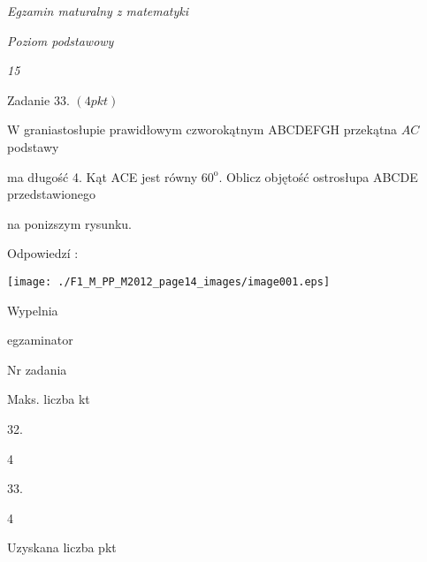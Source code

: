\documentclass[a4paper,12pt]{article}
\begin{document}
{\it Egzamin maturalny z matematyki}

{\it Poziom podstawowy}

{\it 15}

Zadanie 33. $(4pkt)$

$\mathrm{W}$ graniastosłupie prawidłowym czworokątnym ABCDEFGH przekątna $AC$ podstawy

ma długość 4. Kąt ACE jest równy $60^{\mathrm{o}}$. Oblicz objętość ostrosłupa ABCDE przedstawionego

na ponizszym rysunku.

Odpowiedzí :
\begin{center}
\texttt{[image: ./F1\_M\_PP\_M2012\_page14\_images/image001.eps]}
\end{center}
Wypelnia

egzaminator

Nr zadania

Maks. liczba kt

32.

4

33.

4

Uzyskana liczba pkt
\end{document}
